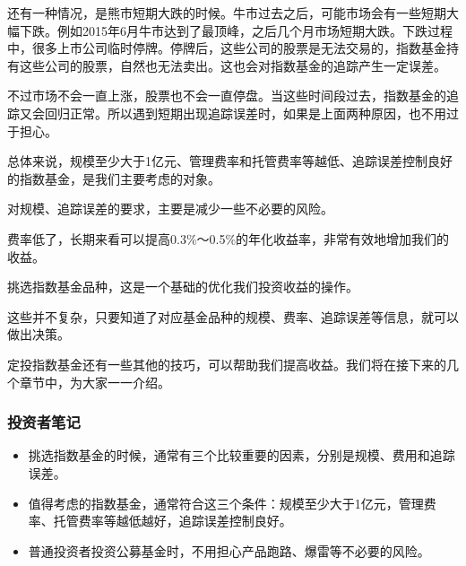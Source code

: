 还有一种情况，是熊市短期大跌的时候。牛市过去之后，可能市场会有一些短期大幅下跌。例如2015年6月牛市达到了最顶峰，之后几个月市场短期大跌。下跌过程中，很多上市公司临时停牌。停牌后，这些公司的股票是无法交易的，指数基金持有这些公司的股票，自然也无法卖出。这也会对指数基金的追踪产生一定误差。

不过市场不会一直上涨，股票也不会一直停盘。当这些时间段过去，指数基金的追踪又会回归正常。所以遇到短期出现追踪误差时，如果是上面两种原因，也不用过于担心。

总体来说，规模至少大于1亿元、管理费率和托管费率等越低、追踪误差控制良好的指数基金，是我们主要考虑的对象。

对规模、追踪误差的要求，主要是减少一些不必要的风险。

费率低了，长期来看可以提高0.3\%～0.5\%的年化收益率，非常有效地增加我们的收益。

挑选指数基金品种，这是一个基础的优化我们投资收益的操作。

这些并不复杂，只要知道了对应基金品种的规模、费率、追踪误差等信息，就可以做出决策。

定投指数基金还有一些其他的技巧，可以帮助我们提高收益。我们将在接下来的几个章节中，为大家一一介绍。

\subsubsection{投资者笔记}

\begin{itemize}
\item {\kaishu 挑选指数基金的时候，通常有三个比较重要的因素，分别是规模、费用和追踪误差。}
\item {\kaishu 值得考虑的指数基金，通常符合这三个条件：规模至少大于1亿元，管理费率、托管费率等越低越好，追踪误差控制良好。}
\item {\kaishu 普通投资者投资公募基金时，不用担心产品跑路、爆雷等不必要的风险。}
\end{itemize}

